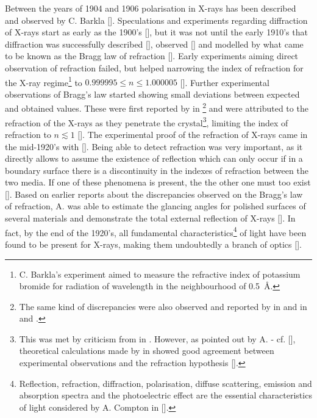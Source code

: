 \begin{refsection}
Between the years of 1904 and 1906 polarisation in X-rays has been described and observed by C. Barkla [\cite{Barkla1904, Barkla1905, Barkla1906}]. Speculations and experiments regarding diffraction of X-rays start as early as the 1900's [\cite{Haga1903,Walter1908,Walter1909}], but it was not until the early 1910's that diffraction was successfully described [\cite{Laue1912}], observed [\cite{FriedrichKnippingLaue1912}] and modelled by what came to be known as the Bragg law of refraction [\cite{BraggW.H.1913}]. Early experiments aiming direct observation of refraction failed, but helped narrowing the index of refraction for the X-ray regime\footnote{C. Barkla's experiment aimed to measure the refractive index of potassium bromide for radiation of wavelength in the neighbourhood of 0.5~\r{A}.} to $0.999995\leq n \leq1.000005$ [\cite{Barkla1916}]. Further experimental observations of Bragg's law started showing small deviations between expected and obtained values. These were first reported by \citeauthor{Stenstrom1919} in \cite*{Stenstrom1919}\footnote{The same kind of discrepancies were also observed and reported by \citeauthor{Duane1920} in \cite*{Duane1920} and \citeauthor{Siegbahn1920} in \cite*{Siegbahn1920} and \cite*{Siegbahn1921}.} and were attributed to the refraction of the X-rays as they penetrate the crystal\footnote{This was met by criticism from \citeauthor{Knipping1920} in \cite*{Knipping1920} \citep{Knipping1920}. However, as pointed out by A. \citeauthor{Compton1923} - cf. [\cite{Compton1923}], theoretical calculations made by \citeauthor{Ewald1920} in \cite*{Ewald1920} showed good agreement between experimental observations and the refraction hypothesis [\cite{Ewald1920}].}, limiting the index of refraction to $n\lesssim1$ [\cite[\textit{§3}]{Stenstrom1919}]. The experimental proof of the refraction of X-rays came in the mid-1920's with [\cite{Larsson1924}]. Being able to detect refraction was very important, as it directly allows to assume the existence of reflection which
can only occur if in a boundary surface there is a discontinuity in the indexes of refraction between the two media. If one of these phenomena is present, the the other one must too exist [\cite{Compton1928}]. Based on earlier reports about the discrepancies observed on the Bragg's law of refraction, A. \citeauthor{Compton1923} was able to estimate the glancing angles for polished surfaces of several materials and demonstrate the total external reflection of X-rays [\cite{Compton1923,Prins1927}]. In fact, by the end of the 1920's, all fundamental characteristics\footnote{Reflection, refraction, diffraction, polarisation, diffuse scattering, emission and absorption spectra and the photoelectric effect are the essential characteristics of light considered by A. Compton in [\cite{Compton1928}].} of light have been found to be present for X-rays, making them undoubtedly a branch of optics [\cite{Compton1928}].  


\end{refsection}
